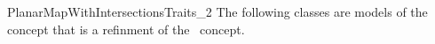 \begin{ccRefConcept}{PlanarMapWithIntersectionsTraits_2}
\ccHasModels
The following classes are models of the 
 concept that is a refinment of the \ccRefName\
concept. 

  \\
  \\
  \\

\end{ccRefConcept}

\ccRefPageEnd
